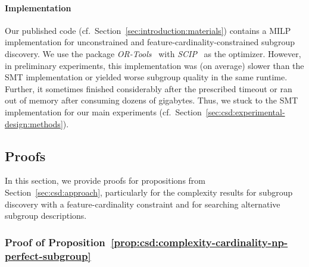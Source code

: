 \paragraph{Implementation}

Our published code (cf.~Section~\ref{sec:introduction:materials}) contains a MILP implementation for unconstrained and feature-cardinality-constrained subgroup discovery.
We use the package \emph{OR-Tools}~\cite{perron2022or-tools} with \emph{SCIP}~\cite{bestuzheva2021scip} as the optimizer.
However, in preliminary experiments, this implementation was (on average) slower than the SMT implementation or yielded worse subgroup quality in the same runtime.
Further, it sometimes finished considerably after the prescribed timeout or ran out of memory after consuming dozens of gigabytes.
Thus, we stuck to the SMT implementation for our main experiments (cf.~Section~\ref{sec:csd:experimental-design:methods}).

\subsection{Proofs}
\label{sec:appendix:csd:proofs}

In this section, we provide proofs for propositions from Section~\ref{sec:csd:approach}, particularly for the complexity results for subgroup discovery with a feature-cardinality constraint and for searching alternative subgroup descriptions.

\subsubsection{Proof of Proposition~\ref{prop:csd:complexity-cardinality-np-perfect-subgroup}}
\label{sec:appendix:csd:proofs:complexity-cardinality-np-perfect-subgroup}

